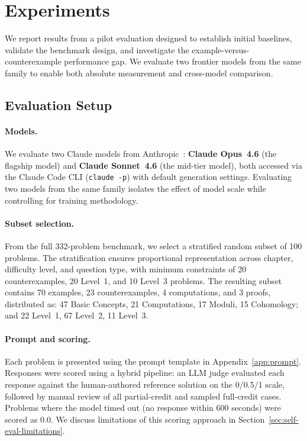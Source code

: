 \section{Experiments}
\label{sec:experiments}

We report results from a pilot evaluation designed to establish initial baselines, validate the benchmark design, and investigate the example-versus-counterexample performance gap.
We evaluate two frontier models from the same family to enable both absolute measurement and cross-model comparison.

\subsection{Evaluation Setup}

\paragraph{Models.}
We evaluate two Claude models from Anthropic~\citep{anthropic2024claude}: \textbf{Claude Opus~4.6} (the flagship model) and \textbf{Claude Sonnet~4.6} (the mid-tier model), both accessed via the Claude Code CLI (\texttt{claude -p}) with default generation settings.
Evaluating two models from the same family isolates the effect of model scale while controlling for training methodology.

\paragraph{Subset selection.}
From the full 332-problem benchmark, we select a stratified random subset of 100 problems.
The stratification ensures proportional representation across chapter, difficulty level, and question type, with minimum constraints of 20 counterexamples, 20 Level~1, and 10 Level~3 problems.
The resulting subset contains 70 examples, 23 counterexamples, 4 computations, and 3 proofs, distributed as: 47 Basic Concepts, 21 Computations, 17 Moduli, 15 Cohomology; and 22 Level~1, 67 Level~2, 11 Level~3.

\paragraph{Prompt and scoring.}
Each problem is presented using the prompt template in Appendix~\ref{app:prompt}.
Responses were scored using a hybrid pipeline: an LLM judge evaluated each response against the human-authored reference solution on the 0/0.5/1 scale, followed by manual review of all partial-credit and sampled full-credit cases.
Problems where the model timed out (no response within 600 seconds) were scored as 0.0.
We discuss limitations of this scoring approach in Section~\ref{sec:self-eval-limitations}.

